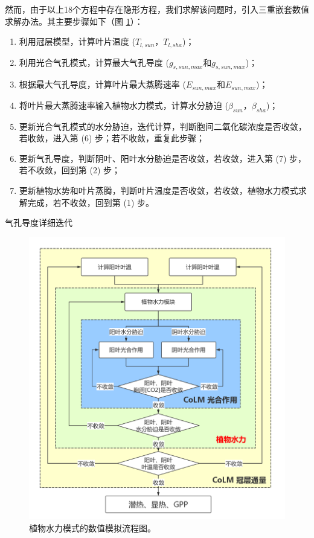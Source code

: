 然而，由于以上18个方程中存在隐形方程，我们求解该问题时，引入三重嵌套数值求解办法。其主要步骤如下（图 \ref{fig:植物水力模式的数值模拟流程图}）：
\begin{enumerate}
    \item 利用冠层模型，计算叶片温度 ($T_{l,sun}$，$T_{l,sha}$)；
    \item 利用光合气孔模式，计算最大气孔导度 ($g_{s,sun,max}$和$g_{s,sun,max}$)；
    \item 根据最大气孔导度，计算叶片最大蒸腾速率 ($E_{sun,max}$和$E_{sun,max}$)；
    \item 将叶片最大蒸腾速率输入植物水力模式，计算水分胁迫 ($\beta_{sun}$，$\beta_{sha}$)；
    \item 更新光合气孔模式的水分胁迫，迭代计算，判断胞间二氧化碳浓度是否收敛，若收敛，进入第 (6) 步；若不收敛，重复此步骤；
    \item 更新气孔导度，判断阴叶、阳叶水分胁迫是否收敛，若收敛，进入第 (7) 步，若不收敛，回到第 (2) 步；
    \item 更新植物水势和叶片蒸腾，判断叶片温度是否收敛，若收敛，植物水力模式求解完成，若不收敛，回到第 (1) 步。
\end{enumerate}

气孔导度详细迭代

{
    \begin{figure}[]
    \centering
    \includegraphics{Figures/植被水力模式/植物水力模式的数值模拟流程图.png}
    \caption{植物水力模式的数值模拟流程图。}
    \label{fig:植物水力模式的数值模拟流程图}
    \end{figure}
    }

